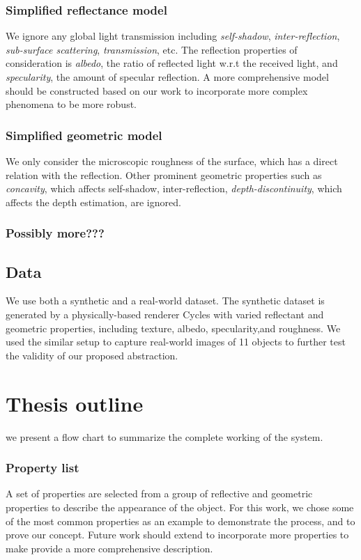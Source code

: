 \subsubsection{Simplified reflectance model}
We ignore any global light transmission including \textit{self-shadow}, \textit{inter-reflection}, \textit{sub-surface scattering}, \textit{transmission}, etc. The reflection properties of consideration is \textit{albedo}, \ie the ratio of reflected light w.r.t the received light, and \textit{specularity}, \ie the amount of specular reflection. A more comprehensive model should be constructed based on our work to incorporate more complex phenomena to be more robust.

\subsubsection{Simplified geometric model}
We only consider the microscopic roughness of the surface, which has a direct relation with the reflection. Other prominent geometric properties such as \textit{concavity}, which affects self-shadow, inter-reflection, \textit{depth-discontinuity}, which affects the depth estimation, are ignored.

\subsubsection{Possibly more???}

\subsection{Data}
We use both a synthetic and a real-world dataset. The synthetic dataset is generated by a physically-based renderer Cycles with varied reflectant and geometric properties, including texture, albedo, specularity,and roughness. We used the similar setup to capture real-world images of 11 objects to further test the validity of our proposed abstraction.

\section{Thesis outline}
we present a flow chart to summarize the complete working of the system.

\subsubsection{Property list}
A set of properties are selected from a group of reflective and geometric properties to describe the appearance of the object. For this work, we chose some of the most common properties as an example to demonstrate the process, and to prove our concept. Future work should extend to incorporate more properties to make provide a more comprehensive description.

